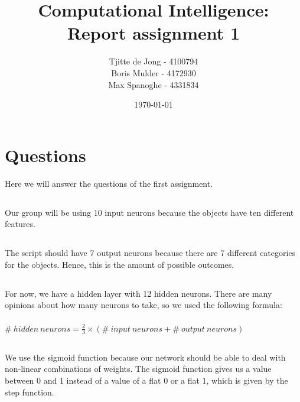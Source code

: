\documentclass{scrartcl}
\begin{document}
\title{Computational Intelligence:
\\Report assignment 1}
\date{\today{}}

\author{
    \begin{tabular}{l r}
    	\\Tjitte de Jong - 4100794
	\\Boris Mulder - 4172930
        \\Max Spanoghe - 4331834
            \end{tabular}
  }
  
  \maketitle \thispagestyle{empty} \pagebreak
  
  \section{Questions}
  Here we will answer the questions of the first assignment.
  
  \subsection{}
  Our group will be using 10 input neurons because the objects have ten different features.
  
  \subsection{}
  The script should have 7 output neurons because there are 7 different categories for the objects.
  Hence, this is the amount of possible outcomes.
  
  \subsection{}
  For now, we have a hidden layer with 12 hidden neurons. There are many opinions about how many neurons to take, so we used the following formula: \\ \\ $\# \:hidden \:neurons = \frac{2} {3} \times (\# \:input \:neurons + \# \:output \:neurons) $
  
  \subsection{}
  We use the sigmoid function because our network should be able to deal with non-linear combinations of weights. The sigmoid function gives us a value between 0 and 1 instead of a value of a flat 0 or a flat 1, which is given by the step function.
  
\end{document}
